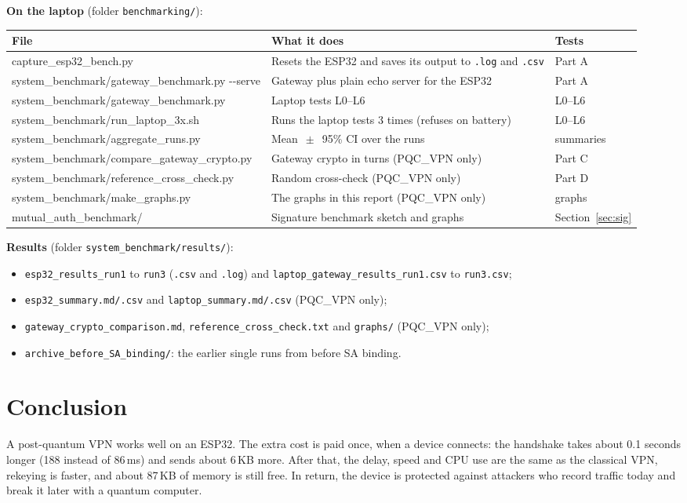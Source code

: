 \documentclass[10pt,a4paper]{article}
\newcommand{\PM}{\ensuremath{\,\pm\,}}
\begin{document}
\textbf{On the laptop} (folder \texttt{benchmarking/}):
\begin{table}[H]\centering\small
\begin{tabularx}{\linewidth}{>{\ttfamily}lLl}
\toprule
\normalfont File & What it does & Tests \\
\midrule
capture\_esp32\_bench.py & Resets the ESP32 and saves its output to \texttt{.log} and \texttt{.csv} & Part A \\
system\_benchmark/gateway\_benchmark.py -{}-serve & Gateway plus plain echo server for the ESP32 & Part A \\
system\_benchmark/gateway\_benchmark.py & Laptop tests L0--L6 & L0--L6 \\
system\_benchmark/run\_laptop\_3x.sh & Runs the laptop tests 3 times (refuses on battery) & L0--L6 \\
system\_benchmark/aggregate\_runs.py & Mean $\PM$ 95\% CI over the runs & summaries \\
system\_benchmark/compare\_gateway\_crypto.py & Gateway crypto in turns (PQC\_VPN only) & Part C \\
system\_benchmark/reference\_cross\_check.py & Random cross-check (PQC\_VPN only) & Part D \\
system\_benchmark/make\_graphs.py & The graphs in this report (PQC\_VPN only) & graphs \\
mutual\_auth\_benchmark/ & Signature benchmark sketch and graphs & Section~\ref{sec:sig} \\
\bottomrule
\end{tabularx}
\end{table}

\textbf{Results} (folder \texttt{system\_benchmark/results/}):
\begin{itemize}[nosep]
  \item \texttt{esp32\_results\_run1} to \texttt{run3} (\texttt{.csv} and \texttt{.log}) and \texttt{laptop\_gateway\_results\_run1.csv} to \texttt{run3.csv};
  \item \texttt{esp32\_summary.md/.csv} and \texttt{laptop\_summary.md/.csv} (PQC\_VPN only);
  \item \texttt{gateway\_crypto\_comparison.md}, \texttt{reference\_cross\_check.txt} and \texttt{graphs/} (PQC\_VPN only);
  \item \texttt{archive\_before\_SA\_binding/}: the earlier single runs from before SA binding.
\end{itemize}

\section*{Conclusion}

A post-quantum VPN works well on an ESP32. The extra cost is paid once, when a device connects: the
handshake takes about 0.1 seconds longer (188 instead of 86\,ms) and sends about 6\,KB more. After that,
the delay, speed and CPU use are the same as the classical VPN, rekeying is faster, and about 87\,KB of
memory is still free. In return, the device is protected against attackers who record traffic today and
break it later with a quantum computer.
\end{document}

